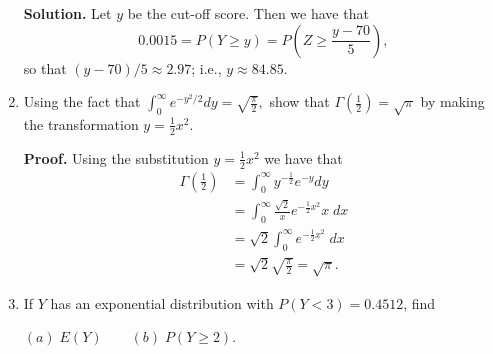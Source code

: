 \documentclass[9pt]{article}
\newcommand{\D}{\displaystyle}
\begin{document}
\begin{enumerate}
      \textbf{Solution.} Let $y$ be the cut-off score. Then we have that
      $$0.0015 = P(Y \ge y) = P\left(Z \ge \frac{y - 70}{5}\right),$$
      so that $(y-70)/5 \approx 2.97$; i.e., $y \approx 84.85$.
   \item Using the fact that
         $\D\int_0^\infty e^{-y^2/2} dy = \sqrt{\frac{\pi}{2}},$ show that
         $\D\Gamma\left(\frac{1}{2}\right) = \sqrt{\pi}$ by making the 
         transformation $y = \frac{1}{2} x^2$.

      \textbf{Proof.} Using the substitution $y = \frac{1}{2} x^2$ we have that
      \begin{align*}
         \Gamma\left(\frac{1}{2}\right) &=
            \int_0^\infty y^{-\frac{1}{2}}e^{-y} dy \\
         &= \int_0^\infty \frac{\sqrt{2}}{x} e^{-\frac{1}{2}x^2} x \; dx \\
         &= \sqrt{2}\int_0^\infty  e^{-\frac{1}{2}x^2} \; dx \\
         &= \sqrt{2} \sqrt{\frac{\pi}{2}} = \sqrt{\pi}.
      \end{align*}
   \item If $Y$ has an exponential distribution with $P(Y < 3) = 0.4512$, find

         $(a)\; E(Y) \qquad (b)\; P(Y \ge 2)$.
\end{enumerate}
\end{document}
